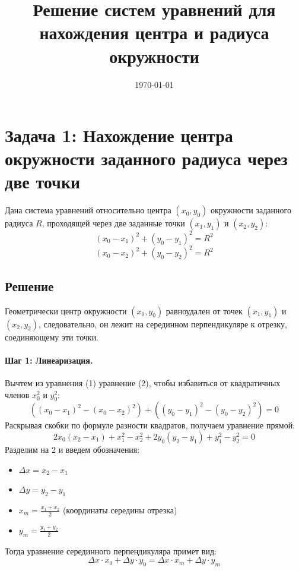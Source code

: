 \documentclass[12pt,a4paper]{article}
\title{Решение систем уравнений для нахождения центра и радиуса окружности}
\author{}
\date{\today}
\begin{document}
\maketitle

\section{Задача 1: Нахождение центра окружности заданного радиуса через две точки}

Дана система уравнений относительно центра $(x_0, y_0)$ окружности заданного радиуса $R$, проходящей через две заданные точки $(x_1, y_1)$ и $(x_2, y_2)$:
\begin{equation}
(x_0 - x_1)^2 + (y_0 - y_1)^2 = R^2
\end{equation}
\begin{equation}
(x_0 - x_2)^2 + (y_0 - y_2)^2 = R^2
\end{equation}

\subsection*{Решение}

Геометрически центр окружности $(x_0, y_0)$ равноудален от точек $(x_1, y_1)$ и $(x_2, y_2)$, следовательно, он лежит на серединном перпендикуляре к отрезку, соединяющему эти точки.

\paragraph{Шаг 1: Линеаризация.}
Вычтем из уравнения (1) уравнение (2), чтобы избавиться от квадратичных членов $x_0^2$ и $y_0^2$:
\[
((x_0 - x_1)^2 - (x_0 - x_2)^2) + ((y_0 - y_1)^2 - (y_0 - y_2)^2) = 0
\]
Раскрывая скобки по формуле разности квадратов, получаем уравнение прямой:
\[
2x_0(x_2 - x_1) + x_1^2 - x_2^2 + 2y_0(y_2 - y_1) + y_1^2 - y_2^2 = 0
\]
Разделим на 2 и введем обозначения:
\begin{itemize}
    \item $\Delta x = x_2 - x_1$
    \item $\Delta y = y_2 - y_1$
    \item $x_m = \frac{x_1 + x_2}{2}$ (координаты середины отрезка)
    \item $y_m = \frac{y_1 + y_2}{2}$
\end{itemize}

Тогда уравнение серединного перпендикуляра примет вид:
\[
\Delta x \cdot x_0 + \Delta y \cdot y_0 = \Delta x \cdot x_m + \Delta y \cdot y_m
\]
\end{document}
